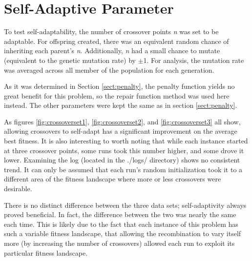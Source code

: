 \documentclass[11pt]{article}
\begin{document}
\newpage
\section{Self-Adaptive Parameter}\label{sect:selfadaptive}

To test self-adaptability, the number of crossover points \textit{n} was set to be adaptable. For offspring created, there was an equivalent random chance of inheriting each parent's \textit{n}. Additionally, \textit{n} had a small chance to mutate (equivalent to the genetic mutation rate) by $\pm$1. For analysis, the mutation rate was averaged across all member of the population for each generation.

As it was determined in Section \ref{sect:penalty}, the penalty function yields no great benefit for this problem, so the repair function method was used here instead. The other parameters were kept the same as in section \ref{sect:penalty}.

As figures \ref{fig:crossoverset1}, \ref{fig:crossoverset2}, and \ref{fig:crossoverset3} all show, allowing crossovers to self-adapt has a significant improvement on the average best fitness. It is also interesting to worth noting that while each instance started at three crossover points, some runs took this number higher, and some drove it lower. Examining the log (located in the ./logs/ directory) shows no consistent trend. It can only be assumed that each run's random initialization took it to a different area of the fitness landscape where more or less crossovers were desirable.

There is no distinct difference between the three data sets; self-adaptivity always proved beneficial. In fact, the difference between the two was nearly the same each time. This is likely due to the fact that each instance of this problem has such a variable fitness landscape, that allowing the recombination to vary itself more (by increasing the number of crossovers) allowed each run to exploit its particular fitness landscape.
\end{document}
